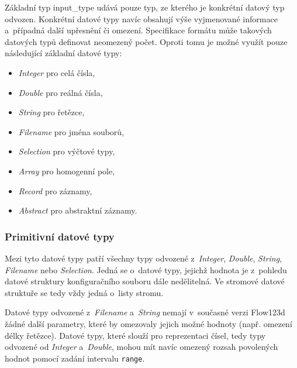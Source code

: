 \documentclass[FM,bw,DP]{tulthesis}
\begin{document}
Základní typ input\_type udává pouze typ, ze kterého je konkrétní datový typ odvozen. Konkrétní datové typy navíc obsahují výše vyjmenované informace a~případná další upřesnění či omezení. Specifikace formátu může takových datových typů definovat neomezený počet. Oproti tomu je možné využít pouze následující základní datové typy:

\begin{itemize}
\item \textit{Integer} pro celá čísla,
\item \textit{Double} pro reálná čísla,
\item \textit{String} pro řetězce,
\item \textit{Filename} pro jména souborů,
\item \textit{Selection} pro výčtové typy,
\item \textit{Array} pro homogenní pole,
\item \textit{Record} pro záznamy,
\item \textit{Abstract} pro abstraktní záznamy.
\end{itemize}



\subsubsection{Primitivní datové typy}

Mezi tyto datové typy patří všechny typy odvozené z~\textit{Integer}, \textit{Double}, \textit{String}, \textit{Filename} nebo \textit{Selection}. Jedná se o~datové typy, jejichž hodnota je z~pohledu datové struktury konfiguračního souboru dále nedělitelná. Ve stromové datové struktuře se tedy vždy jedná o~listy stromu.

Datové typy odvozené z~\textit{Filename} a~\textit{String} nemají v~současné verzi Flow123d žádné další parametry, které by omezovaly jejich možné hodnoty (např. omezení délky řetězce). Datové typy, které slouží pro reprezentaci čísel, tedy typy odvozené od \textit{Integer} a~\textit{Double}, mohou mít navíc omezený rozsah povolených hodnot pomocí zadání intervalu \texttt{range}.
\end{document}
